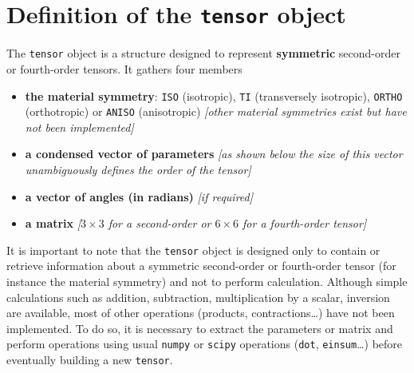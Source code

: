 \documentclass[
  letterpaper,
  DIV=11,
  numbers=noendperiod]{scrreprt}
\providecommand{\tightlist}{%
  \setlength{\itemsep}{0pt}\setlength{\parskip}{0pt}}\usepackage{longtable,booktabs,array}
\begin{document}
\section{\texorpdfstring{Definition of the \texttt{tensor}
object}{Definition of the tensor object}}\label{definition-of-the-tensor-object}

The \texttt{tensor} object is a structure designed to represent
\textbf{symmetric} second-order or fourth-order tensors. It gathers four
members

\begin{itemize}
\tightlist
\item
  \textbf{the material symmetry}: \texttt{ISO} (isotropic), \texttt{TI}
  (transversely isotropic), \texttt{ORTHO} (orthotropic) or
  \texttt{ANISO} (anisotropic) \emph{{[}other material symmetries exist
  but have not been implemented{]}}
\item
  \textbf{a condensed vector of parameters} \emph{{[}as shown below the
  size of this vector unambiguously defines the order of the tensor{]}}
\item
  \textbf{a vector of angles (in radians)} \emph{{[}if required{]}}
\item
  \textbf{a matrix} \emph{{[}\(3×3\) for a second-order or \(6×6\) for a
  fourth-order tensor{]}}
\end{itemize}

\begin{tcolorbox}[enhanced jigsaw, left=2mm, bottomrule=.15mm, colbacktitle=quarto-callout-warning-color!10!white, colback=white, colframe=quarto-callout-warning-color-frame, rightrule=.15mm, bottomtitle=1mm, toptitle=1mm, titlerule=0mm, title=\textcolor{quarto-callout-warning-color}{\faExclamationTriangle}\hspace{0.5em}{Warning}, toprule=.15mm, arc=.35mm, opacityback=0, opacitybacktitle=0.6, leftrule=.75mm, breakable, coltitle=black]

It is important to note that the \texttt{tensor} object is designed only
to contain or retrieve information about a symmetric second-order or
fourth-order tensor (for instance the material symmetry) and not to
perform calculation. Although simple calculations such as addition,
subtraction, multiplication by a scalar, inversion are available, most
of other operations (products, contractions\ldots) have not been
implemented. To do so, it is necessary to extract the parameters or
matrix and perform operations using usual \texttt{numpy} or
\texttt{scipy} operations (\texttt{dot}, \texttt{einsum}\ldots) before
eventually building a new \texttt{tensor}.

\end{tcolorbox}
\end{document}
